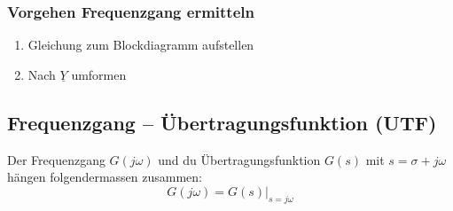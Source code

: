 \subsubsection{Vorgehen Frequenzgang ermitteln}
\begin{enumerate}
    \item Gleichung zum Blockdiagramm aufstellen
    \item Nach $\underline{Y}$ umformen 
\end{enumerate}

\subsection{Frequenzgang -- Übertragungsfunktion (UTF)}

Der Frequenzgang $G(j \omega)$ und du Übertragungsfunktion $G(s)$ mit $s = \sigma + j \omega$ hängen folgendermassen zusammen:
$$ \boxed{G(j \omega) = G(s) \big\vert_{s = j \omega}} $$